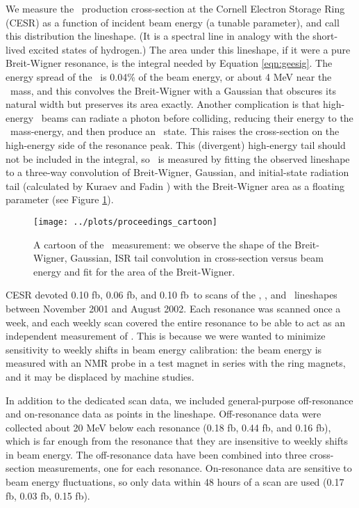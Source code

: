 \documentclass[aps,prd,preprint,superscriptaddress,tightenlines,nofootinbib,floatfix]{revtex4}
\begin{document}
We measure the \ups\ production cross-section at the Cornell Electron
Storage Ring (CESR) as a function of incident beam energy (a tunable
parameter), and call this distribution the lineshape.  (It is a
spectral line in analogy with the short-lived excited states of
hydrogen.)  The area under this lineshape, if it were a pure
Breit-Wigner resonance, is the integral needed by Equation
\ref{eqn:geesig}.  The energy spread of the \ee\ is 0.04\% of the beam energy, or about 4
MeV near the \ups\ mass, and this convolves the Breit-Wigner with a
Gaussian that obscures its natural width but preserves its area
exactly.  Another complication is that high-energy \ee\ beams can
radiate a photon before colliding, reducing their energy to the \ups\
mass-energy, and then produce an \ups\ state.  This raises the cross-section
on the high-energy side of the resonance peak.  This (divergent)
high-energy tail should not be included in the integral, so \gee\ is
measured by fitting the observed lineshape to a three-way convolution
of Breit-Wigner, Gaussian, and initial-state radiation tail
(calculated by Kuraev and Fadin \cite{kf}) \cite{kb} with the Breit-Wigner area
as a floating parameter (see Figure \ref{fig:cartoon}).

\begin{figure}[t]
  \begin{center}
    \texttt{[image: ../plots/proceedings\_cartoon]}
  \end{center}
  \caption{\label{fig:cartoon} A cartoon of the \gee\ measurement: we
    observe the shape of the Breit-Wigner, Gaussian, ISR tail
    convolution in cross-section versus beam energy and fit for the
    area of the Breit-Wigner.}
\end{figure}

CESR devoted 0.10 fb\inv, 0.06 fb\inv, and 0.10 fb\inv\ to scans of
the \uone, \utwo, and \uthree\ lineshapes between November 2001 and
August 2002.  Each resonance was scanned once a week, and each weekly
scan covered the entire resonance to be able to act as an independent
measurement of \gee.  This is because we were wanted to minimize
sensitivity to weekly shifts in beam energy calibration: the beam
energy is measured with an NMR probe in a test magnet in series with
the ring magnets, and it may be displaced by machine studies.

In addition to the dedicated scan data, we included general-purpose
off-resonance and on-resonance data as points in the lineshape.
Off-resonance data were collected about 20 MeV below each resonance
(0.18 fb\inv, 0.44 fb\inv, and 0.16 fb\inv), which is far enough from
the resonance that they are insensitive to weekly shifts in beam
energy.  The off-resonance data have been combined into three
cross-section measurements, one for each resonance.  On-resonance data
are sensitive to beam energy fluctuations, so only data within 48
hours of a scan are used (0.17 fb\inv, 0.03 fb\inv, 0.15 fb\inv).
\end{document}
